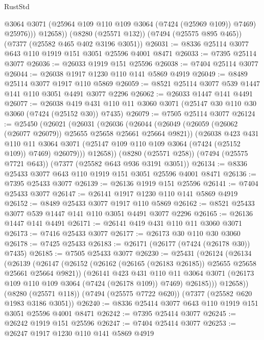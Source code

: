 \begin{lexlean}{RustStd}
\begin{coremodule}
              @3064
              @3071
              (@25964 @109 @110 @109 @3064 (@7424 (@25969 @109)) @7469)
              @25976)))
        @12658))
    (@8280 (@25571 @132))
    (@7494 (@25575 @895 @465))
    (@7377 (@25582 @465 @402 @3196 @3051))
@26031 := @8336 @25114 @3077 @643 @110 @1919 @151 @3051 @25596 @4001 @8471
@26033 := @7395 @25114 @3077
@26036 := @26033 @1919 @151 @25596
@26038 := @7404 @25114 @3077
@26044 := @26038 @1917 @1230 @110 @141 @5869 @4919
@26049 := @8489 @25114 @3077 @1917 @110 @5869
@26059 := @8521 @25114 @3077 @539 @1447 @141 @110 @3051 @4491 @3077 @2296
@26062 := @26033 @1447 @141 @4491
@26077 := @26038
    @419
    @431
    @110
    @11
    @3060
    @3071
    (@25147 @30 @110 @30 @3060 (@7424 (@25152 @30)) @7435)
@26079 := @7505 @25114 @3077
@26124 := @25450
    (@26021
      (@26031
        (@26036
          (@26044
            (@26049 (@26059 (@26062 (@26077 @26079)) @25655 @25658 @25661 @25664 @9821))
            (@26038
              @423
              @431
              @110
              @11
              @3064
              @3071
              (@25147 @109 @110 @109 @3064 (@7424 (@25152 @109)) @7469)
              @26079)))
        @12658))
    (@8280 (@25571 @258))
    (@7494 (@25575 @7721 @643))
    (@7377 (@25582 @643 @936 @3191 @3051))
@26134 := @8336 @25433 @3077 @643 @110 @1919 @151 @3051 @25596 @4001 @8471
@26136 := @7395 @25433 @3077
@26139 := @26136 @1919 @151 @25596
@26141 := @7404 @25433 @3077
@26147 := @26141 @1917 @1230 @110 @141 @5869 @4919
@26152 := @8489 @25433 @3077 @1917 @110 @5869
@26162 := @8521 @25433 @3077 @539 @1447 @141 @110 @3051 @4491 @3077 @2296
@26165 := @26136 @1447 @141 @4491
@26171 := @26141 @419 @431 @110 @11 @3060 @3071
@26173 := @7416 @25433 @3077
@26177 := @26173 @30 @110 @30 @3060
@26178 := @7425 @25433
@26183 := @26171 (@26177 (@7424 (@26178 @30)) @7435)
@26185 := @7505 @25433 @3077
@26230 := @25431
    (@26124
      (@26134
        (@26139
          (@26147
            (@26152 (@26162 (@26165 (@26183 @26185)) @25655 @25658 @25661 @25664 @9821))
            (@26141
              @423
              @431
              @110
              @11
              @3064
              @3071
              (@26173 @109 @110 @109 @3064 (@7424 (@26178 @109)) @7469)
              @26185)))
        @12658))
    (@8280 (@25571 @118))
    (@7494 (@25575 @7722 @620))
    (@7377 (@25582 @620 @1983 @3186 @3051))
@26240 := @8336 @25414 @3077 @643 @110 @1919 @151 @3051 @25596 @4001 @8471
@26242 := @7395 @25414 @3077
@26245 := @26242 @1919 @151 @25596
@26247 := @7404 @25414 @3077
@26253 := @26247 @1917 @1230 @110 @141 @5869 @4919

\end{coremodule}
\end{lexlean}
